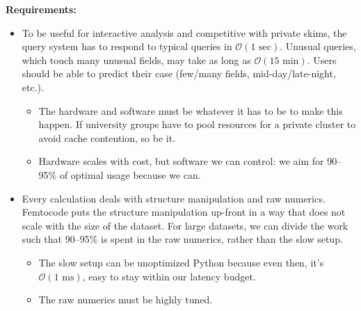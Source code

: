 \documentclass{beamer}
\begin{document}

\begin{frame}
\vspace{0.5 cm}
{\bf Requirements:}

\small
\begin{itemize}
\item To be useful for interactive analysis and competitive with private skims, the query system has to respond to typical queries in $\mathcal{O}(\mbox{1 sec})$. Unusual queries, which touch many unusual fields, may take as long as $\mathcal{O}(\mbox{15 min})$. Users should be able to predict their case (few/many fields, mid-day/late-night, etc.).
\begin{itemize}
\item The hardware and software must be whatever it has to be to make this happen. If university groups have to pool resources for a private cluster to avoid cache contention, so be it.
\item Hardware scales with cost, but software we can control: we aim for 90--95\% of optimal usage because we can.
\end{itemize}

\item Every calculation deals with structure manipulation and raw numerics. Femtocode puts the structure manipulation up-front in a way that does not scale with the size of the dataset. For large datasets, we can divide the work such that 90--95\% is spent in the raw numerics, rather than the slow setup.
\begin{itemize}
\item The slow setup can be unoptimized Python because even then, it's $\mathcal{O}(\mbox{1 ms})$, easy to stay within our latency budget.
\item The raw numerics must be highly tuned.
\end{itemize}
\end{itemize}
\end{frame}
\end{document}
